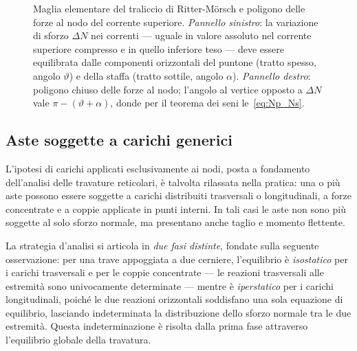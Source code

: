 \begin{figure}[htbp]
	\caption{Maglia elementare del traliccio di Ritter-Mörsch
		e poligono delle forze al nodo del corrente superiore.
		\emph{Pannello sinistro}: la variazione di sforzo
		$\Delta N$ nei correnti --- uguale in valore assoluto
		nel corrente superiore compresso e in quello inferiore
		teso --- deve essere equilibrata dalle componenti
		orizzontali del puntone (tratto spesso, angolo
		$\vartheta$) e della staffa (tratto sottile, angolo
		$\alpha$).
		\emph{Pannello destro}: poligono chiuso delle forze
		al nodo; l'angolo al vertice opposto a $\Delta N$
		vale $\pi - (\vartheta+\alpha)$, donde per il
		teorema dei seni le~\eqref{eq:Np_Ns}.}
	\label{fig:maglia_Morsch}
\end{figure}


\subsection{Aste soggette a carichi generici}
\label{sec:aste_caricate_trasv}

L'ipotesi di carichi applicati esclusivamente ai nodi,
posta a fondamento dell'analisi delle travature
reticolari, è talvolta rilassata nella pratica: una
o più aste possono essere soggette a carichi
distribuiti trasversali o longitudinali, a forze
concentrate e a coppie applicate in punti interni.
In tali casi le aste non sono più soggette al solo
sforzo normale, ma presentano anche taglio e momento
flettente.

La strategia d'analisi si articola in \emph{due fasi
	distinte}, fondate sulla seguente osservazione: per
una trave appoggiata a due cerniere, l'equilibrio
è \emph{isostatico} per i carichi trasversali e per
le coppie concentrate --- le reazioni trasversali
alle estremità sono univocamente determinate ---
mentre è \emph{iperstatico} per i carichi
longitudinali, poiché le due reazioni orizzontali
soddisfano una sola equazione di equilibrio,
lasciando indeterminata la distribuzione dello
sforzo normale tra le due estremità. Questa
indeterminazione è risolta dalla prima fase
attraverso l'equilibrio globale della travatura.




